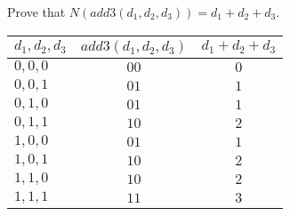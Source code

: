 \documentclass{tufte-handout}
\begin{document}
\begin{Exercise}
\label{ex:bit-add}
Prove that 
$N (\mathit{add3}(d_1, d_2, d_3)) = d_1 + d_2 + d_3$.
\end{Exercise}
\begin{Answer}
\begin{tabular}{l|c|c} 
    $d_1, d_2, d_3$ & $\mathit{add3}(d_1, d_2, d_3)$ 
  & $d_1 + d_2 + d_3$ \\ \hline
  $0,0,0$ & $00$ & $0$ \\
  $0,0,1$ & $01$ & $1$\\
  $0,1,0$ & $01$ & $1$ \\
  $0,1,1$ & $10$ & $2$ \\
  $1,0,0$ & $01$ & $1$ \\
  $1,0,1$ & $10$ & $2$ \\
  $1,1,0$ & $10$ & $2$\\
  $1,1,1$ & $11$ & $3$
\end{tabular} 
\end{Answer}
\end{document}
